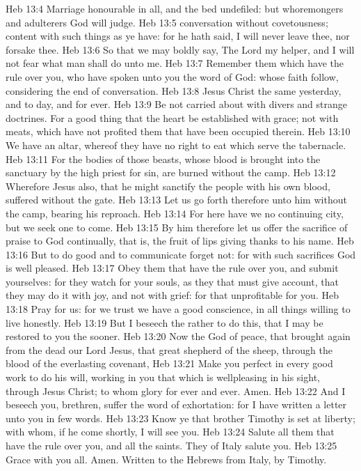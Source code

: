 \vs Heb 13:4 Marriage  honourable in all, and the bed undefiled: but whoremongers and adulterers God will judge.
\vs Heb 13:5  conversation  without covetousness;  content with such things as ye have: for he hath said, I will never leave thee, nor forsake thee.
\vs Heb 13:6 So that we may boldly say, The Lord  my helper, and I will not fear what man shall do unto me.
\vs Heb 13:7 Remember them which have the rule over you, who have spoken unto you the word of God: whose faith follow, considering the end of  conversation.
\vs Heb 13:8 Jesus Christ the same yesterday, and to day, and for ever.
\vs Heb 13:9 Be not carried about with divers and strange doctrines. For  a good thing that the heart be established with grace; not with meats, which have not profited them that have been occupied therein.
\vs Heb 13:10 We have an altar, whereof they have no right to eat which serve the tabernacle.
\vs Heb 13:11 For the bodies of those beasts, whose blood is brought into the sanctuary by the high priest for sin, are burned without the camp.
\vs Heb 13:12 Wherefore Jesus also, that he might sanctify the people with his own blood, suffered without the gate.
\vs Heb 13:13 Let us go forth therefore unto him without the camp, bearing his reproach.
\vs Heb 13:14 For here have we no continuing city, but we seek one to come.
\vs Heb 13:15 By him therefore let us offer the sacrifice of praise to God continually, that is, the fruit of  lips giving thanks to his name.
\vs Heb 13:16 But to do good and to communicate forget not: for with such sacrifices God is well pleased.
\vs Heb 13:17 Obey them that have the rule over you, and submit yourselves: for they watch for your souls, as they that must give account, that they may do it with joy, and not with grief: for that  unprofitable for you.
\vs Heb 13:18 Pray for us: for we trust we have a good conscience, in all things willing to live honestly.
\vs Heb 13:19 But I beseech  the rather to do this, that I may be restored to you the sooner.
\vs Heb 13:20 Now the God of peace, that brought again from the dead our Lord Jesus, that great shepherd of the sheep, through the blood of the everlasting covenant,
\vs Heb 13:21 Make you perfect in every good work to do his will, working in you that which is wellpleasing in his sight, through Jesus Christ; to whom  glory for ever and ever. Amen.
\vs Heb 13:22 And I beseech you, brethren, suffer the word of exhortation: for I have written a letter unto you in few words.
\vs Heb 13:23 Know ye that  brother Timothy is set at liberty; with whom, if he come shortly, I will see you.
\vs Heb 13:24 Salute all them that have the rule over you, and all the saints. They of Italy salute you.
\vs Heb 13:25 Grace  with you all. Amen. Written to the Hebrews from Italy, by Timothy.
